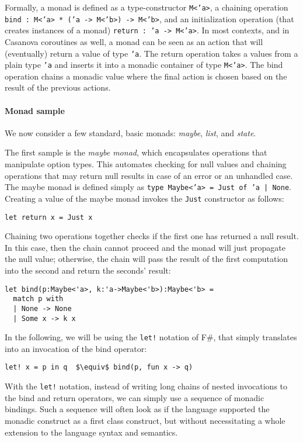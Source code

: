 Formally, a monad is defined as a type-constructor \texttt{M<'a>}, a chaining operation \texttt{bind : M<'a> * ('a -> M<'b>) -> M<'b>}, and an initialization operation (that creates instances of a monad) \texttt{return : 'a -> M<'a>}. In most contexts, and in Casanova coroutines as well, a monad can be seen as an action that will (eventually) return a value of type \texttt{'a}. The return operation takes a values from a plain type \texttt{'a} and inserts it into a monadic container of type \texttt{M<'a>}. The bind operation chains a monadic value where the final action is chosen based on the result of the previous actions.

\paragraph{Monad sample}
We now consider a few standard, basic monads: \textit{maybe}, \textit{list}, and \textit{state}.

The first sample is the \textit{maybe monad}, which encapsulates operations that manipulate option types. This automates checking for null values and chaining operations that may return null results in case of an error or an unhandled case. The maybe monad is defined simply as \texttt{type Maybe<'a> = Just of 'a | None}. Creating a value of the maybe monad invokes the \texttt{Just} constructor as follows:

\begin{lstlisting}
let return x = Just x
\end{lstlisting}

Chaining two operations together checks if the first one has returned a null result. In this case, then the chain cannot proceed and the monad will just propagate the null value; otherwise, the chain will pass the result of the first computation into the second and return the seconds' result:

\begin{lstlisting}
let bind(p:Maybe<'a>, k:'a->Maybe<'b>):Maybe<'b> =
  match p with
  | None -> None
  | Some x -> k x
\end{lstlisting}

In the following, we will be using the \texttt{let!} notation of F\#, that simply translates into an invocation of the bind operator:

\begin{lstlisting}
let! x = p in q  $\equiv$ bind(p, fun x -> q)
\end{lstlisting}

With the \texttt{let!} notation, instead of writing long chains of nested invocations to the bind and return operators, we can simply use a sequence of monadic bindings. Such a sequence will often look as if the language supported the monadic construct as a first class construct, but without necessitating a whole extension to the language syntax and semantics.


